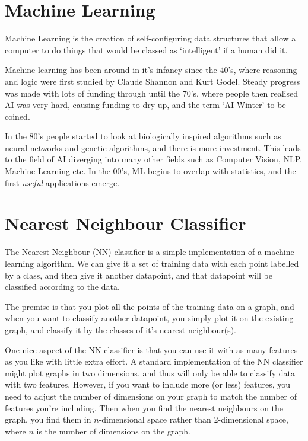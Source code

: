 
\section{Machine Learning}

Machine Learning is the creation of self-configuring data structures that allow
a computer to do things that would be classed as `intelligent' if a human did
it.

Machine learning has been around in it's infancy since the 40's, where reasoning
and logic were first studied by Claude Shannon and Kurt Godel. Steady progress
was made with lots of funding through until the 70's, where people then realised
AI was very hard, causing funding to dry up, and the term `AI Winter' to be
coined.

In the 80's people started to look at biologically inspired algorithms such as
neural networks and genetic algorithms, and there is more investment. This leads
to the field of AI diverging into many other fields such as Computer Vision,
NLP, Machine Learning etc. In the 00's, ML begins to overlap with statistics,
and the first {\it useful} applications emerge.

\section{Nearest Neighbour Classifier}

The Nearest Neighbour (NN) classifier is a simple implementation of a machine
learning algorithm. We can give it a set of training data with each point
labelled by a class, and then give it another datapoint, and that datapoint will
be classified according to the data.

The premise is that you plot all the points of the training data on a graph, and
when you want to classify another datapoint, you simply plot it on the existing
graph, and classify it by the classes of it's nearest neighbour(s).


One nice aspect of the NN classifier is that you can use it with as many
features as you like with little extra effort. A standard implementation of the
NN classifier might plot graphs in two dimensions, and thus will only be able to
classify data with two features. However, if you want to include more (or less)
features, you need to adjust the number of dimensions on your graph to match the
number of features you're including. Then when you find the nearest neighbours
on the graph, you find them in $n$-dimensional space rather than 2-dimensional
space, where $n$ is the number of dimensions on the graph.

